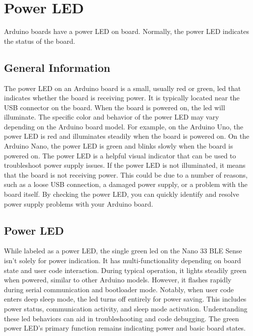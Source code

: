 %
%



\chapter{Power LED}

Arduino boards have a power LED on board. Normally, the power LED indicates the status of the board.

\section{General Information}

The power LED on an Arduino board is a small, usually red or green, \ac{led} that indicates whether the board is receiving power. It is typically located near the USB connector on the board. When the board is powered on, the \ac{led} will illuminate. The specific color and behavior of the power LED may vary depending on the Arduino board model. For example, on the Arduino Uno, the power LED is red and illuminates steadily when the board is powered on. On the Arduino Nano, the power LED is green and blinks slowly when the board is powered on. The power LED is a helpful visual indicator that can be used to troubleshoot power supply issues. If the power LED is not illuminated, it means that the board is not receiving power. This could be due to a number of reasons, such as a loose USB connection, a damaged power supply, or a problem with the board itself. By checking the power LED, you can quickly identify and resolve power supply problems with your Arduino board. \cite{ArduinoNanoGetStarted:2024,Arduino:2023a,Arduino:2023,ArduinoNano33Manual:2022,Kurniawan:2021b}


\section{Power LED}

While labeled as a power LED, the single green \ac{led} on the Nano 33 BLE Sense isn't solely for power indication. It has multi-functionality depending on board state and user code interaction. During typical operation, it lights steadily green when powered, similar to other Arduino models.
However, it flashes rapidly during serial communication and bootloader mode.
Notably, when user code enters deep sleep mode, the \ac{led} turns off entirely for power saving. This includes power status, communication activity, and sleep mode activation.
Understanding these \ac{led} behaviors can aid in troubleshooting and code debugging.
The green power LED's primary function remains indicating power and basic board states. \cite{ArduinoNanoGetStarted:2024,Arduino:2023a,Arduino:2023,ArduinoNano33Manual:2022}

